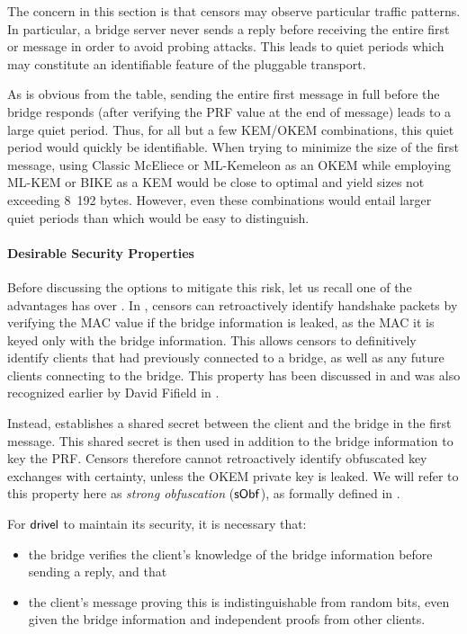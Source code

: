 The concern in this section is that censors may observe particular traffic patterns. In particular, a bridge server never sends a reply before receiving the entire first \drivel{} or \obfsfour{} message in order to avoid probing attacks. This leads to quiet periods which may constitute an identifiable feature of the pluggable transport.

As is obvious from the table, sending the entire first \drivel{} message in full before the bridge responds (after verifying the PRF value at the end of message) leads to a large quiet period. Thus, for all but a few KEM/OKEM combinations, this quiet period would quickly be identifiable. When trying to minimize the size of the first \drivel{} message, using Classic McEliece or ML-Kemeleon as an OKEM while employing ML-KEM or BIKE as a KEM would be close to optimal and yield sizes not exceeding 8~192 bytes. However, even these combinations would entail larger quiet periods than \obfsfour{} which would be easy to distinguish.

\paragraph{Desirable Security Properties}
Before discussing the options to mitigate this risk, let us recall one of the advantages \drivel{} has over \obfsfour{}. In \obfsfour{}, censors can retroactively identify handshake packets by verifying the MAC value if the bridge information is leaked, as the MAC it is keyed only with the bridge information. This allows censors to definitively identify clients that had previously connected to a bridge, as well as any future clients connecting to the bridge. This property has been discussed in \cite[Section~6]{CCS:GunSteVei24} and was also recognized earlier by David Fifield in \cite{obfs4-pk-reveal-distinguisher}.

Instead, \drivel{} establishes a shared secret between the client and the bridge in the first message. This shared secret is then used in addition to the bridge information to key the PRF. Censors therefore cannot retroactively identify obfuscated key exchanges with certainty, unless the OKEM private key is leaked. We will refer to this property here as \emph{strong obfuscation} ($\mathsf{sObf}$), as formally defined in \cite{CCS:GunSteVei24}.

For $\textsf{drivel}$ to maintain its security, it is necessary that:
\begin{itemize}
    \item[a)] the bridge verifies the client's knowledge of the bridge information before sending a reply, and that
    \item[b)] the client's message proving this is indistinguishable from random bits, even given the bridge information and independent proofs from other clients.
\end{itemize}

